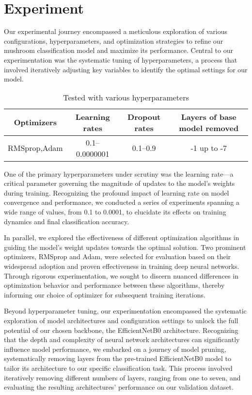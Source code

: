 \section{Experiment}

Our experimental journey encompassed a meticulous exploration of various configurations, hyperparameters, and optimization strategies to refine our mushroom classification model and maximize its performance. Central to our experimentation was the systematic tuning of hyperparameters, a process that involved iteratively adjusting key variables to identify the optimal settings for our model.


\begin{table}[htbp]
    \centering
    \caption{Tested with various hyperparameters}
    \begin{tabular}{|c|c|c|c|}
        \hline
        \textbf{Optimizers} & \textbf{Learning rates } & \textbf{Dropout rates} & \textbf{Layers of base model removed} \\
        \hline
        \multirow{1}{*}{RMSprop,Adam} & \multirow{1}{*}{0.1--0.0000001} & \multirow{1}{*}{0.1--0.9} & \multirow{1}{*}{-1 up to -7} \\
        \hline
    \end{tabular}
\end{table}



One of the primary hyperparameters under scrutiny was the learning rate—a critical parameter governing the magnitude of updates to the model’s weights during training. Recognizing the profound impact of learning rate on model convergence and performance, we conducted a series of experiments spanning a wide range of values, from 0.1 to 0.0001, to elucidate its effects on training dynamics and final classification accuracy.

In parallel, we explored the effectiveness of different optimization algorithms in guiding the model's weight updates towards the optimal solution. Two prominent optimizers, RMSprop and Adam, were selected for evaluation based on their widespread adoption and proven effectiveness in training deep neural networks. Through rigorous experimentation, we sought to discern nuanced differences in optimization behavior and performance between these algorithms, thereby informing our choice of optimizer for subsequent training iterations.

Beyond hyperparameter tuning, our experimentation encompassed the systematic exploration of model architectures and configuration settings to unlock the full potential of our chosen backbone, the EfficientNetB0 architecture. Recognizing that the depth and complexity of neural network architectures can significantly influence model performance, we embarked on a journey of model pruning, systematically removing layers from the pre-trained EfficientNetB0 model to tailor its architecture to our specific classification task. This process involved iteratively removing different numbers of layers, ranging from one to seven, and evaluating the resulting architectures' performance on our validation dataset.

